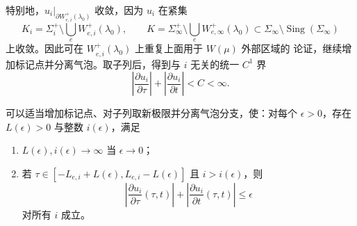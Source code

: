 特别地，$u_i|_{\partial W_{e,i}^+(\lambda_0)}$ 收敛，因为 $u_i$ 在紧集
\[
 K_i=\Sigma_i^+\setminus\bigcup_eW_{e,i}^+(\lambda_0),
 \qquad
 K=\Sigma_\infty^+\setminus\bigcup_eW_{e,\infty}^+(\lambda_0)
 \subset\Sigma_\infty\setminus\operatorname{Sing}(\Sigma_\infty)
\]
上收敛。因此可在 $W_{e,i}^+(\lambda_0)$ 上重复上面用于 $W(\mu)$ 外部区域的
论证，继续增加标记点并分离气泡。取子列后，得到与 $i$ 无关的统一 $C^1$ 界
\begin{equation}
 \left|\frac{\partial u_i}{\partial\tau}\right|
 +\left|\frac{\partial u_i}{\partial t}\right|<C<\infty.
 \label{eq:uniform-derivative-bound-neck}
\end{equation}

\begin{lemma}\label{lem:small-derivative-middle-long-neck}
可以适当增加标记点、对子列取新极限并分离气泡分支，使：对每个
$\epsilon>0$，存在 $L(\epsilon)>0$ 与整数 $i(\epsilon)$，满足
\begin{enumerate}[label=(\roman*)]
 \item $L(\epsilon),i(\epsilon)\to\infty$ 当 $\epsilon\to0$；
 \item 若 $\tau\in[-L_{e,i}+L(\epsilon),L_{e,i}-L(\epsilon)]$ 且
 $i>i(\epsilon)$，则
 \[
  \left|\frac{\partial u_i}{\partial\tau}(\tau,t)\right|
  +\left|\frac{\partial u_i}{\partial t}(\tau,t)\right|\le\epsilon
 \]
 对所有 $i$ 成立。
\end{enumerate}
\end{lemma}

